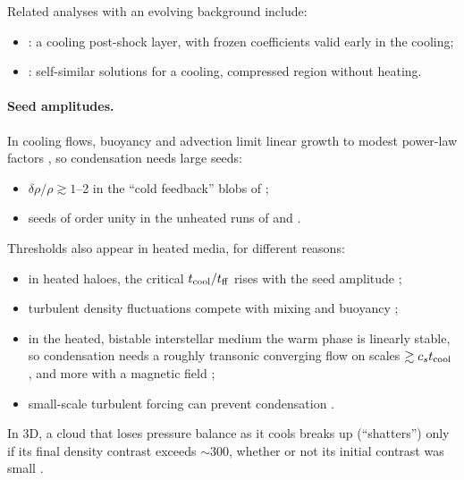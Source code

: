 \documentclass[11pt]{article}
\begin{document}
Related analyses with an evolving background include:
\begin{itemize}
\item \citet{koyama00}: a cooling post-shock layer, with frozen coefficients valid
  early in the cooling;
\item \citet{hennebelle99,hennebelle00}: self-similar solutions for a cooling,
  compressed region without heating.
\end{itemize}

\paragraph{Seed amplitudes.} In cooling flows, buoyancy and advection limit linear
growth to modest power-law factors \citep{balbus89}, so condensation needs large
seeds:
\begin{itemize}
\item $\delta\rho/\rho\gtrsim1$--2 in the ``cold feedback'' blobs of \citet{pizzolato05};
\item seeds of order unity in the unheated runs of \citet[their appendix A]{sharma12}
  and \citet{mccourt12}.
\end{itemize}
Thresholds also appear in heated media, for different reasons:
\begin{itemize}
\item in heated haloes, the critical $t_{\rm cool}/t_{\rm ff}$ rises with the seed
  amplitude \citep{choudhury19};
\item turbulent density fluctuations compete with mixing and buoyancy
  \citep{mohapatra23};
\item in the heated, bistable interstellar medium the warm phase is linearly stable,
  so condensation needs a roughly transonic converging flow on scales
  $\gtrsim c_st_{\rm cool}$ \citep{hennebelle99}, and more with a magnetic field
  \citep{hennebelle00};
\item small-scale turbulent forcing can prevent condensation \citep{sanchez02}.
\end{itemize}
In 3D, a cloud that loses pressure balance as it cools breaks up (``shatters'')
only if its final density contrast exceeds $\sim300$, whether or not its initial
contrast was small \citep{mccourt18,gronke20}.
\end{document}
